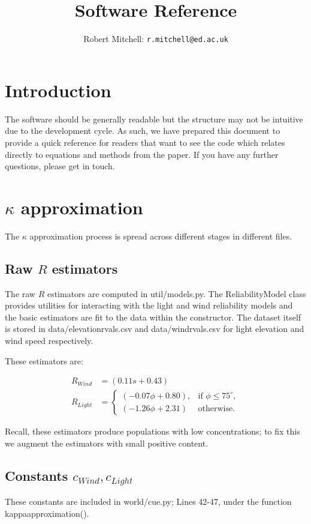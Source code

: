 \documentclass[10pt, a4paper]{article}
\begin{document}
\title{Software Reference}
\author{Robert Mitchell: \texttt{r.mitchell@ed.ac.uk}}
\maketitle
\section{Introduction}
The software should be generally readable but the structure may not be
intuitive due to the development cycle. As such, we have prepared this
document to provide a quick reference for readers that want to see the
code which relates directly to equations and methods from the
paper. If you have any further questions, please get in touch.

\section{$\kappa$ approximation}
The $\kappa$ approximation process is spread across different stages
in different files.

\subsection{Raw $R$ estimators}
The raw $R$ estimators are computed in util/models.py. The
ReliabilityModel class provides utilities for interacting with the
light and wind reliability models and the basic estimators are fit to
the data within the constructor. The dataset itself is stored in
data/elevation\textunderscore rvals.csv and
data/wind\textunderscore rvals.csv for light elevation and wind speed
respectively.

These estimators are:

\begin{align}
  R_{Wind} &= (0.11s + 0.43)\\
  R_{Light} &=
  \begin{cases}
    (-0.07\phi + 0.80), &\text{if } \phi \leq 75^\circ,\\
    (-1.26\phi + 2.31) &\text{otherwise.}
  \end{cases}
\end{align}

Recall, these estimators produce populations with low concentrations;
to fix this we augment the estimators with small positive content.

\subsection{Constants $c_{Wind}, c_{Light}$}
These constants are included in world/cue.py; Lines 42-47, under the function
\textunderscore\textunderscore kappa\textunderscore approximation().
\end{document}
